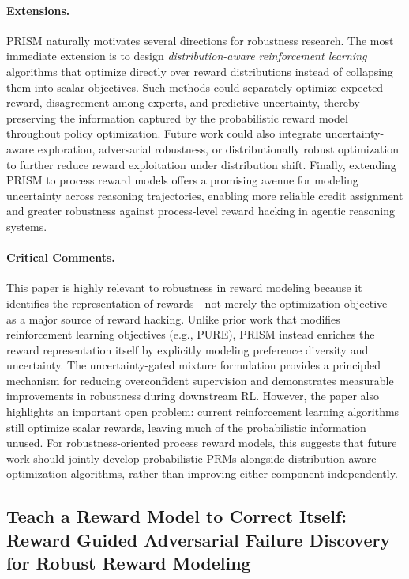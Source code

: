 \documentclass[11pt]{article}
\begin{document}
\paragraph{Extensions.}
PRISM naturally motivates several directions for robustness research. The most immediate extension is to design \emph{distribution-aware reinforcement learning} algorithms that optimize directly over reward distributions instead of collapsing them into scalar objectives. Such methods could separately optimize expected reward, disagreement among experts, and predictive uncertainty, thereby preserving the information captured by the probabilistic reward model throughout policy optimization. Future work could also integrate uncertainty-aware exploration, adversarial robustness, or distributionally robust optimization to further reduce reward exploitation under distribution shift. Finally, extending PRISM to process reward models offers a promising avenue for modeling uncertainty across reasoning trajectories, enabling more reliable credit assignment and greater robustness against process-level reward hacking in agentic reasoning systems.  

\paragraph{Critical Comments.}
This paper is highly relevant to robustness in reward modeling because it identifies the representation of rewards—not merely the optimization objective—as a major source of reward hacking. Unlike prior work that modifies reinforcement learning objectives (e.g., PURE), PRISM instead enriches the reward representation itself by explicitly modeling preference diversity and uncertainty. The uncertainty-gated mixture formulation provides a principled mechanism for reducing overconfident supervision and demonstrates measurable improvements in robustness during downstream RL. However, the paper also highlights an important open problem: current reinforcement learning algorithms still optimize scalar rewards, leaving much of the probabilistic information unused. For robustness-oriented process reward models, this suggests that future work should jointly develop probabilistic PRMs alongside distribution-aware optimization algorithms, rather than improving either component independently.


\subsection{Teach a Reward Model to Correct Itself: Reward Guided Adversarial Failure Discovery for Robust Reward Modeling}
\end{document}
